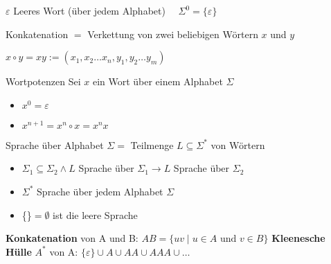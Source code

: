 \begin{remark}
    $\varepsilon$ Leeres Wort (über jedem Alphabet) $\quad \Sigma^{0}=\{\varepsilon\}$
\end{remark}

\begin{definition}{Konkatenation}
    $=$ Verkettung von zwei beliebigen Wörtern $x$ und $y$

    $
    x \circ y=x y:=\left(x_{1}, x_{2} \ldots x_{n}, y_{1}, y_{2} \ldots y_{m}\right)
    $
\end{definition}

\begin{definition}{Wortpotenzen} Sei $x$ ein Wort über einem Alphabet $\Sigma$\\
    \begin{minipage}{0.2\linewidth}
        \begin{itemize}
            \item $x^{0}=\varepsilon$
        \end{itemize}
    \end{minipage}
    \begin{minipage}{0.5\linewidth}
        \begin{itemize}
            \item $x^{n+1}=x^{n} \circ x=x^{n} x$
        \end{itemize}
    \end{minipage}
\end{definition}

\begin{definition}{Sprache}
    über Alphabet $\Sigma=$ Teilmenge $L \subseteq \Sigma^{*}$ von Wörtern
    \begin{itemize}
    \item $\Sigma_{1} \subseteq \Sigma_{2} \wedge L$ Sprache über $\Sigma_{1} \rightarrow L$ Sprache über $\Sigma_{2}$
    \item $\Sigma^{*}$ Sprache über jedem Alphabet $\Sigma$
    \item \{\}$=\emptyset$ ist die leere Sprache
    \end{itemize}

    \textbf{Konkatenation} von A und B: $A B=\{u v \mid u \in A \text { und } v \in B\}$
    \textbf{Kleenesche Hülle} $A^{*}$ von A: $\{\varepsilon\} \cup A \cup A A \cup A A A \cup \ldots$
\end{definition}